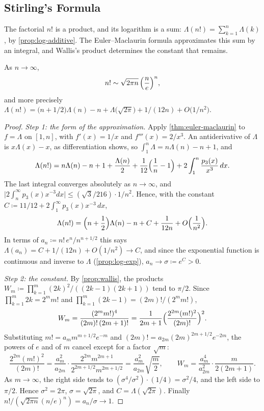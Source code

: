 \subsection{Stirling's Formula}

The factorial $n!$ is a product, and its logarithm is a sum: $\Lambda(n!)=\sum_{k=1}^n\Lambda(k)$, by \cref{prop:log-additive}. The Euler--Maclaurin formula approximates this sum by an integral, and Wallis's product determines the constant that remains.

\begin{theorem}
\label{thm:stirling}
As $n\to\infty$,
\[
n!\sim\sqrt{2\pi n}\,\Bigl(\frac ne\Bigr)^n,
\]
and more precisely $\Lambda(n!)=\bigl(n+1/2\bigr)\Lambda(n)-n+\Lambda\bigl(\sqrt{2\pi}\bigr)+1/(12n)+O\bigl(1/n^2\bigr)$.
\end{theorem}

\begin{proof}
\emph{Step 1: the form of the approximation.} Apply \cref{thm:euler-maclaurin} to $f=\Lambda$ on $[1,n]$, with $f'(x)=1/x$ and $f'''(x)=2/x^3$. An antiderivative of $\Lambda$ is $x\Lambda(x)-x$, as differentiation shows, so $\int_1^n\Lambda=n\Lambda(n)-n+1$, and
\[
\Lambda(n!)=n\Lambda(n)-n+1+\frac{\Lambda(n)}2+\frac1{12}\Bigl(\frac1n-1\Bigr)+2\int_1^n\frac{p_3(x)}{x^3}\,dx .
\]
The last integral converges absolutely as $n\to\infty$, and $\bigl|2\int_n^\infty p_3(x)x^{-3}dx\bigr|\le(\sqrt3/216)\cdot1/n^2$. Hence, with the constant $C\coloneqq11/12+2\int_1^\infty p_3(x)x^{-3}\,dx$,
\begin{equation}
\Lambda(n!)=\Bigl(n+\frac12\Bigr)\Lambda(n)-n+C+\frac1{12n}+O\Bigl(\frac1{n^2}\Bigr).
\label{eq:stirling-log}
\end{equation}
In terms of $a_n\coloneqq n!\,e^n/n^{n+1/2}$ this says $\Lambda(a_n)=C+1/(12n)+O(1/n^2)\to C$, and since the exponential function is continuous and inverse to $\Lambda$ (\cref{prop:log-exp}), $a_n\to\sigma\coloneqq e^C>0$.

\emph{Step 2: the constant.} By \cref{prop:wallis}, the products $W_m\coloneqq\prod_{k=1}^m(2k)^2/((2k-1)(2k+1))$ tend to $\pi/2$. Since $\prod_{k=1}^m2k=2^mm!$ and $\prod_{k=1}^m(2k-1)=(2m)!/(2^mm!)$,
\[
W_m=\frac{(2^mm!)^4}{(2m)!\,(2m+1)!}=\frac1{2m+1}\Bigl(\frac{2^{2m}(m!)^2}{(2m)!}\Bigr)^2 .
\]
Substituting $m!=a_mm^{m+1/2}e^{-m}$ and $(2m)!=a_{2m}(2m)^{2m+1/2}e^{-2m}$, the powers of $e$ and of $m$ cancel except for a factor $\sqrt m$:
\[
\frac{2^{2m}(m!)^2}{(2m)!}=\frac{a_m^2}{a_{2m}}\cdot\frac{2^{2m}m^{2m+1}}{2^{2m+1/2}m^{2m+1/2}}=\frac{a_m^2}{a_{2m}}\sqrt{\frac m2},\qquad W_m=\frac{a_m^4}{a_{2m}^2}\cdot\frac m{2(2m+1)} .
\]
As $m\to\infty$, the right side tends to $(\sigma^4/\sigma^2)\cdot(1/4)=\sigma^2/4$, and the left side to $\pi/2$. Hence $\sigma^2=2\pi$, $\sigma=\sqrt{2\pi}$, and $C=\Lambda(\sqrt{2\pi})$. Finally $n!/(\sqrt{2\pi n}(n/e)^n)=a_n/\sigma\to1$.
\end{proof}


